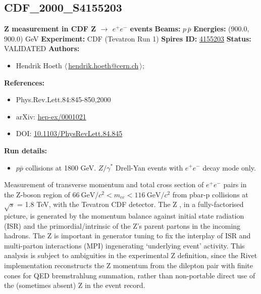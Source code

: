 \subsection[CDF\_2000\_S4155203]{CDF\_2000\_S4155203\,\cite{Affolder:1999jh}}
\textbf{Z \pT measurement in CDF Z \ensuremath{\to} $e^+e^-$ events}\newline
\textbf{Beams:} $p$\,$\bar{p}$ \newline
\textbf{Energies:} (900.0, 900.0) GeV \newline
\textbf{Experiment:} CDF (Tevatron Run 1) \newline
\textbf{Spires ID:} \href{http://www.slac.stanford.edu/spires/find/hep/www?rawcmd=key+4155203}{4155203}\newline
\textbf{Status:} VALIDATED\newline
\textbf{Authors:}
\begin{itemize}
  \item Hendrik Hoeth $\langle\,$\href{mailto:hendrik.hoeth@cern.ch}{hendrik.hoeth@cern.ch}$\,\rangle$;
\end{itemize}
\textbf{References:}
\begin{itemize}
  \item Phys.Rev.Lett.84:845-850,2000
  \item arXiv: \href{http://arxiv.org/abs/hep-ex/0001021}{hep-ex/0001021}
  \item DOI: \href{http://dx.doi.org/10.1103/PhysRevLett.84.845}{10.1103/PhysRevLett.84.845}
\end{itemize}
\textbf{Run details:}
\begin{itemize}

  \item $p\bar{p}$ collisions at 1800 GeV. $Z/\gamma^*$ Drell-Yan events with $e^+e^-$ decay mode only.\end{itemize}

\noindent Measurement of transverse momentum and total cross section of $e^+e^-$ pairs in the Z-boson region of $66~\text{GeV}/c^2 < m_{ee} < 116~\text{GeV}/c^2$ from pbar-p collisions at \ensuremath{\sqrt{s}} = 1.8 TeV, with the Tevatron CDF detector.  The Z \pT, in a fully-factorised picture, is generated by the momentum balance against initial state radiation (ISR) and the primordial/intrinsic \pT of the Z's parent partons in the incoming hadrons. The Z \pT is important in generator tuning to fix the interplay of ISR and multi-parton interactions (MPI) ingenerating `underlying event' activity.
This analysis is subject to ambiguities in the experimental Z \pT definition, since the Rivet implementation reconstructs the Z momentum from the dilepton pair with finite cones for QED bremstrahlung summation, rather than non-portable direct use of the (sometimes absent) Z in the event record.

